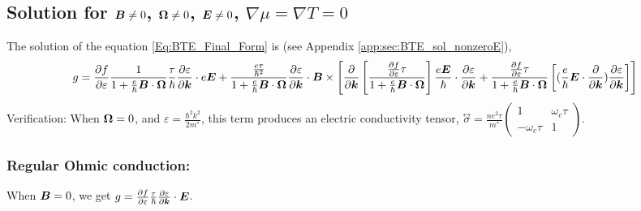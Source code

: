 \documentclass{report}
\renewcommand\vec[1]{\ensuremath\boldsymbol{#1}} %
\begin{document}

\subsection{Solution for $\vec{B}\neq0$, $\vec{\Omega}\neq 0$, $\vec{E} \neq 0$, $\nabla \mu = \nabla T = 0$}
The solution of the equation \eqref{Eq:BTE_Final_Form} is (see Appendix \ref{app:sec:BTE_sol_nonzeroE}),
\begin{equation}\label{Eq:gnonzeroE}
	g = \frac{\partial f} {\partial \varepsilon}\frac{1}{1 + \frac{e}{\hbar} \vec{B}\cdot\vec{\Omega}}
	\frac{\tau}{\hbar} \frac{\partial \varepsilon}{\partial \vec{k}}\cdot e \vec{E} + \frac{\frac{e \tau}{\hbar^2} }{1 + \frac{e}{\hbar} \vec{B}\cdot\vec{\Omega}} \frac{\partial \varepsilon}{\partial \vec{k}} \cdot \vec{B} \times \left[ \frac{\partial}{\partial \vec{k}} \left[ \frac{\frac{\partial f} {\partial \varepsilon} \tau}{1 + \frac{e}{\hbar} \vec{B}\cdot\vec{\Omega}}
	\right] \frac{e \vec{E}}{\hbar} \cdot \frac{\partial \varepsilon}{\partial \vec{k}} + \frac{\frac{\partial f} {\partial \varepsilon} \tau}{1 + \frac{e}{\hbar} \vec{B}\cdot\vec{\Omega}} \left[(\frac{e}{\hbar} \vec{E}\cdot \frac{\partial }{\partial \vec{k}} )\frac{\partial \varepsilon}{\partial \vec{k}} \right] \right]
\end{equation}
Verification: When $\vec{\Omega} = 0$, and $\varepsilon = \frac{\hbar^2 k^2}{2 m^*}$, this term produces an electric conductivity tensor, $\stackrel{\leftrightarrow}{\sigma} = \frac{n e^2 \tau}{m^*} \begin{pmatrix}
	1 & \omega_c \tau \\
	-\omega_c \tau & 1 
\end{pmatrix}$.

\subsubsection{Regular Ohmic conduction:}\label{subsubsec:regularOhmic}
 When $\vec{B} = 0$, we get $ g = \frac{\partial f} {\partial \varepsilon}
\frac{\tau}{\hbar} \frac{\partial \varepsilon}{\partial \vec{k}}\cdot  \vec{E}
$.
\end{document}
